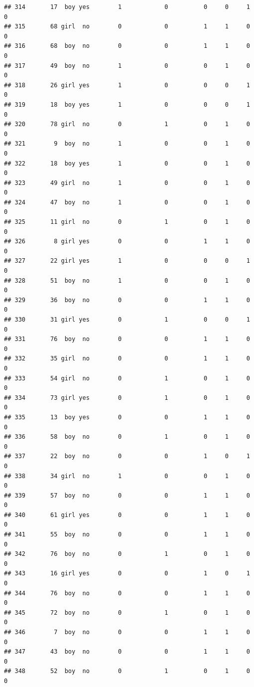 \documentclass[man]{apa6}
\begin{document}
\begin{verbatim}
## 314       17  boy yes        1            0          0     0     1     0
## 315       68 girl  no        0            0          1     1     0     0
## 316       68  boy  no        0            0          1     1     0     0
## 317       49  boy  no        1            0          0     1     0     0
## 318       26 girl yes        1            0          0     0     1     0
## 319       18  boy yes        1            0          0     0     1     0
## 320       78 girl  no        0            1          0     1     0     0
## 321        9  boy  no        1            0          0     1     0     0
## 322       18  boy yes        1            0          0     1     0     0
## 323       49 girl  no        1            0          0     1     0     0
## 324       47  boy  no        1            0          0     1     0     0
## 325       11 girl  no        0            1          0     1     0     0
## 326        8 girl yes        0            0          1     1     0     0
## 327       22 girl yes        1            0          0     0     1     0
## 328       51  boy  no        1            0          0     1     0     0
## 329       36  boy  no        0            0          1     1     0     0
## 330       31 girl yes        0            1          0     0     1     0
## 331       76  boy  no        0            0          1     1     0     0
## 332       35 girl  no        0            0          1     1     0     0
## 333       54 girl  no        0            1          0     1     0     0
## 334       73 girl yes        0            1          0     1     0     0
## 335       13  boy yes        0            0          1     1     0     0
## 336       58  boy  no        0            1          0     1     0     0
## 337       22  boy  no        0            0          1     0     1     0
## 338       34 girl  no        1            0          0     1     0     0
## 339       57  boy  no        0            0          1     1     0     0
## 340       61 girl yes        0            0          1     1     0     0
## 341       55  boy  no        0            0          1     1     0     0
## 342       76  boy  no        0            1          0     1     0     0
## 343       16 girl yes        0            0          1     0     1     0
## 344       76  boy  no        0            0          1     1     0     0
## 345       72  boy  no        0            1          0     1     0     0
## 346        7  boy  no        0            0          1     1     0     0
## 347       43  boy  no        0            0          1     1     0     0
## 348       52  boy  no        0            1          0     1     0     0

\end{verbatim}
\end{document}
